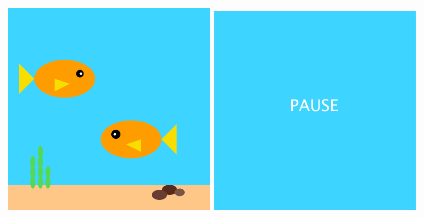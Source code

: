 \documentclass{ucph-handout}
\begin{document}
\begin{exercisebox}[adjusted title=Sæt på pause (Akvarie-projektet)]
\begin{center}
  \includegraphics[width=0.40\textwidth]{../illustrations/images/fisk-begge-retninger.png}
  \quad
\includegraphics[width=0.4\textwidth]{../illustrations/images/fish-paused}
\end{center}
\end{exercisebox}





\end{document}
